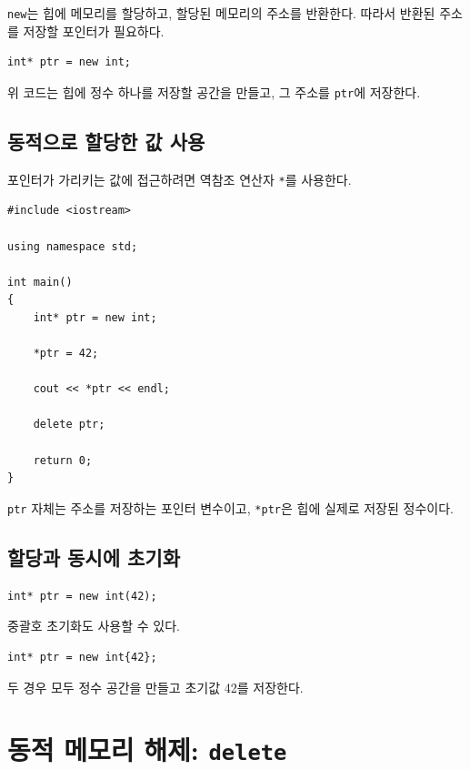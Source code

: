 \documentclass[11pt,a4paper]{article}
\begin{document}
\texttt{new}는 힙에 메모리를 할당하고, 할당된 메모리의 주소를 반환한다.
따라서 반환된 주소를 저장할 포인터가 필요하다.

\begin{lstlisting}
int* ptr = new int;
\end{lstlisting}

위 코드는 힙에 정수 하나를 저장할 공간을 만들고, 그 주소를 \texttt{ptr}에 저장한다.

\subsection{동적으로 할당한 값 사용}

포인터가 가리키는 값에 접근하려면 역참조 연산자 \texttt{*}를 사용한다.

\begin{lstlisting}
#include <iostream>

using namespace std;

int main()
{
    int* ptr = new int;

    *ptr = 42;

    cout << *ptr << endl;

    delete ptr;

    return 0;
}
\end{lstlisting}

\texttt{ptr} 자체는 주소를 저장하는 포인터 변수이고, \texttt{*ptr}은 힙에 실제로 저장된 정수이다.

\subsection{할당과 동시에 초기화}

\begin{lstlisting}
int* ptr = new int(42);
\end{lstlisting}

중괄호 초기화도 사용할 수 있다.

\begin{lstlisting}
int* ptr = new int{42};
\end{lstlisting}

두 경우 모두 정수 공간을 만들고 초기값 42를 저장한다.

\section{동적 메모리 해제: \texttt{delete}}
\end{document}
